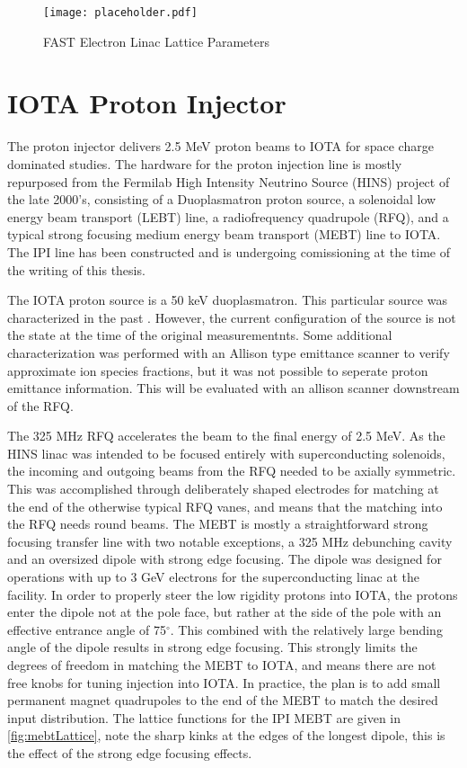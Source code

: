 \begin{figure}
	\centering
	\texttt{[image: placeholder.pdf]}
	\caption{FAST Electron Linac Lattice Parameters}
	\label{fig:linacLat}
\end{figure}

\section{IOTA Proton Injector}

The proton injector delivers 2.5 MeV proton beams to IOTA for space charge dominated studies. The hardware for the proton injection line is mostly repurposed from the Fermilab High Intensity Neutrino Source (HINS) \cite{webberHINS} project of the late 2000's, consisting of a Duoplasmatron proton source, a solenoidal low energy beam transport (LEBT) line, a radiofrequency quadrupole (RFQ), and a typical strong focusing medium energy beam transport (MEBT) line \cite{edstromIPI} to IOTA. The IPI line has been constructed and is undergoing comissioning at the time of the writing of this thesis.

The IOTA proton source is a 50 keV duoplasmatron. This particular source was characterized in the past \cite{tamThesis}. However, the current configuration of the source is not the state at the time of the original measurementnts. Some additional characterization was performed with an Allison type emittance scanner to verify approximate ion species fractions, but it was not possible to seperate proton emittance information. This will be evaluated with an allison scanner downstream of the RFQ.

The 325 MHz RFQ accelerates the beam to the final energy of 2.5 MeV. As the HINS linac was intended to be focused entirely with superconducting solenoids, the incoming and outgoing beams from the RFQ needed to be axially symmetric. This was accomplished through deliberately shaped electrodes for matching at the end of the otherwise typical RFQ vanes, and means that the matching into the RFQ needs round beams. 
The MEBT is mostly a straightforward strong focusing transfer line with two notable exceptions, a 325 MHz debunching cavity and an oversized dipole with strong edge focusing. The dipole was designed for operations with up to 3 GeV electrons for the superconducting linac at the facility. In order to properly steer the low rigidity protons into IOTA, the protons enter the dipole not at the pole face, but rather at the side of the pole with an effective entrance angle of 75$^\circ$. This combined with the relatively large bending angle of the dipole results in strong edge focusing. This strongly limits the degrees of freedom in matching the MEBT to IOTA, and means there are not free knobs for tuning injection into IOTA. In practice, the plan is to add small permanent magnet quadrupoles to the end of the MEBT to match the desired input distribution. The lattice functions for the IPI MEBT are given in \ref{fig:mebtLattice}, note the sharp kinks at the edges of the longest dipole, this is the effect of the strong edge focusing effects.

